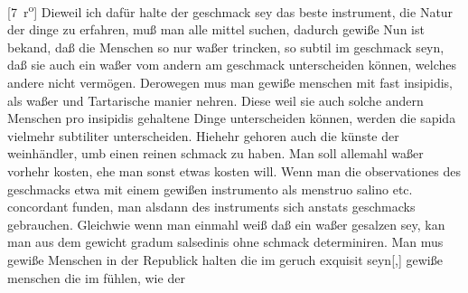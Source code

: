 [7~r\textsuperscript{o}]
\pend%
\newpage
\pstart%
Dieweil ich daf\"{u}r halte der geschmack\protect{} sey das beste instrument, die Natur der dinge zu erfahren,
mu{\ss} man alle mittel suchen, dadurch gewi{\ss}e
Nun ist bekand, da{\ss} die Menschen so nur wa{\ss}er trincken, so subtil im geschmack seyn, da{\ss} sie auch ein wa{\ss}er vom andern am geschmack\protect{} unterscheiden k\"{o}nnen, welches andere nicht verm\"{o}gen. Derowegen mus man gewi{\ss}e menschen mit fast insipidis\protect{}, als wa{\ss}er und
Tartarische manier nehren. Diese weil sie auch solche andern Menschen pro insipidis gehaltene Dinge unterscheiden k\"{o}nnen, werden die sapida\protect{} vielmehr subtiliter unterscheiden. Hiehehr gehoren auch die k\"{u}nste der weinh\"{a}ndler, umb einen reinen schmack\protect{} zu haben. Man soll allemahl wa{\ss}er vorhehr kosten, ehe man sonst etwas kosten will.
\pend%
\pstart%
Wenn man die observationes des geschmacks\protect{} etwa mit einem gewi{\ss}en instrumento als menstruo\protect{} salino etc. concordant funden,
man alsdann des instruments sich anstats geschmacks\protect{} gebrauchen. Gleichwie wenn man einmahl wei{\ss} da{\ss} ein wa{\ss}er gesalzen sey, kan man aus dem gewicht gradum salsedinis\protect{} ohne schmack\protect{} determiniren.
\pend%
\pstart%
Man mus gewi{\ss}e Menschen in der Republick halten die im geruch\protect{} exquisit seyn[,]
gewi{\ss}e menschen die im f\"{u}hlen\protect{},
wie der 
